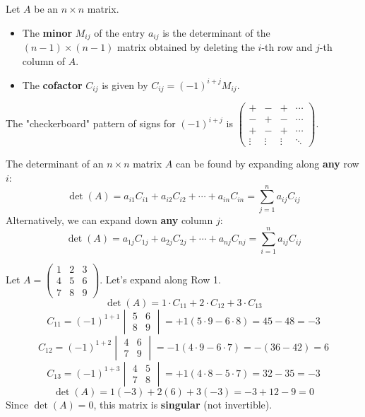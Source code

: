 \documentclass[oneside]{book}
\begin{document}
\begin{definition}
Let $A$ be an $n \times n$ matrix.
\begin{itemize}
    \item The \textbf{minor} $M_{ij}$ of the entry $a_{ij}$ is the determinant of the $(n-1) \times (n-1)$ matrix obtained by deleting the $i$-th row and $j$-th column of $A$.
    \item The \textbf{cofactor} $C_{ij}$ is given by $C_{ij} = (-1)^{i+j} M_{ij}$.
\end{itemize}
\end{definition}

The "checkerboard" pattern of signs for $(-1)^{i+j}$ is $\begin{pmatrix} + & - & + & \cdots \\ - & + & - & \cdots \\ + & - & + & \cdots \\ \vdots & \vdots & \vdots & \ddots \end{pmatrix}$.

\begin{theorem}
The determinant of an $n \times n$ matrix $A$ can be found by expanding along \textbf{any} row $i$:
\[ \det(A) = a_{i1}C_{i1} + a_{i2}C_{i2} + \cdots + a_{in}C_{in} = \sum_{j=1}^{n} a_{ij}C_{ij} \]
Alternatively, we can expand down \textbf{any} column $j$:
\[ \det(A) = a_{1j}C_{1j} + a_{2j}C_{2j} + \cdots + a_{nj}C_{nj} = \sum_{i=1}^{n} a_{ij}C_{ij} \]
\end{theorem}

\begin{example}
Let $A = \begin{pmatrix} 1 & 2 & 3 \\ 4 & 5 & 6 \\ 7 & 8 & 9 \end{pmatrix}$. Let's expand along Row 1.
\[ \det(A) = 1 \cdot C_{11} + 2 \cdot C_{12} + 3 \cdot C_{13} \]
\[ C_{11} = (-1)^{1+1} \begin{vmatrix} 5 & 6 \\ 8 & 9 \end{vmatrix} = +1(5\cdot 9 - 6\cdot 8) = 45 - 48 = -3 \]
\[ C_{12} = (-1)^{1+2} \begin{vmatrix} 4 & 6 \\ 7 & 9 \end{vmatrix} = -1(4\cdot 9 - 6\cdot 7) = -(36 - 42) = 6 \]
\[ C_{13} = (-1)^{1+3} \begin{vmatrix} 4 & 5 \\ 7 & 8 \end{vmatrix} = +1(4\cdot 8 - 5\cdot 7) = 32 - 35 = -3 \]
\[ \det(A) = 1(-3) + 2(6) + 3(-3) = -3 + 12 - 9 = 0 \]
Since $\det(A) = 0$, this matrix is \textbf{singular} (not invertible).
\end{example}
\end{document}
